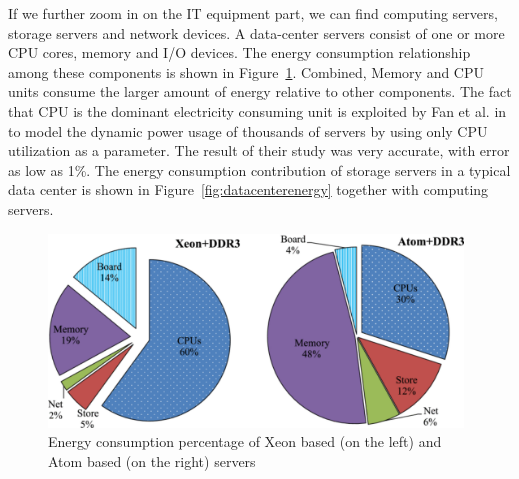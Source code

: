 If we further zoom in on the IT equipment part, we can find computing servers, storage servers and network devices. A data-center servers consist of one or more CPU cores, memory and I/O devices. The energy consumption relationship among these components is shown in Figure~\ref{fig:serverenergy}. Combined, Memory and CPU units consume the larger amount of energy relative to other components. The fact that CPU is the dominant electricity consuming unit is exploited by Fan et al. in \cite{DBLP:conf/isca/FanWB07} to model the dynamic power usage of thousands of servers by using only CPU utilization as a parameter. The result of their study was very accurate, with error as low as 1\%. The energy consumption contribution of storage servers in a typical data center is shown in Figure~\ref{fig:datacenterenergy} together with computing servers.
\begin{figure}[ht]
	\begin{center}
		\includegraphics[width=11cm]{images/serverenergy.pdf}
		\caption{Energy consumption percentage of Xeon based (on the left) and Atom based (on the right) servers \cite{DBLP:journals/comsur/DayarathnaWF16}}
		\label{fig:serverenergy}
	\end{center}
\end{figure}

